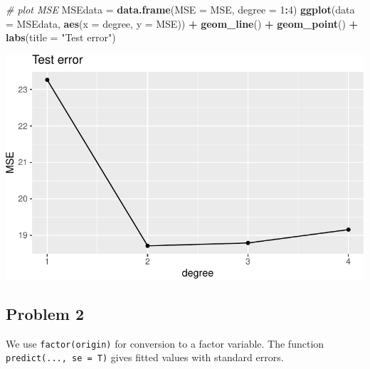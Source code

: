 \documentclass[]{article}
\newenvironment{Shaded}{\begin{snugshade}}{\end{snugshade}}
\newcommand{\CommentTok}[1]{\textcolor[rgb]{0.56,0.35,0.01}{\textit{#1}}}
\newcommand{\DataTypeTok}[1]{\textcolor[rgb]{0.13,0.29,0.53}{#1}}
\newcommand{\DecValTok}[1]{\textcolor[rgb]{0.00,0.00,0.81}{#1}}
\newcommand{\KeywordTok}[1]{\textcolor[rgb]{0.13,0.29,0.53}{\textbf{#1}}}
\newcommand{\NormalTok}[1]{#1}
\newcommand{\OperatorTok}[1]{\textcolor[rgb]{0.81,0.36,0.00}{\textbf{#1}}}
\newcommand{\StringTok}[1]{\textcolor[rgb]{0.31,0.60,0.02}{#1}}
\begin{document}
\begin{Shaded}
\begin{Highlighting}[]
\CommentTok{# plot MSE}
\NormalTok{MSEdata =}\StringTok{ }\KeywordTok{data.frame}\NormalTok{(}\DataTypeTok{MSE =}\NormalTok{ MSE, }\DataTypeTok{degree =} \DecValTok{1}\OperatorTok{:}\DecValTok{4}\NormalTok{)}
\KeywordTok{ggplot}\NormalTok{(}\DataTypeTok{data =}\NormalTok{ MSEdata, }\KeywordTok{aes}\NormalTok{(}\DataTypeTok{x =}\NormalTok{ degree, }\DataTypeTok{y =}\NormalTok{ MSE)) }\OperatorTok{+}\StringTok{ }\KeywordTok{geom_line}\NormalTok{() }\OperatorTok{+}\StringTok{ }\KeywordTok{geom_point}\NormalTok{() }\OperatorTok{+}\StringTok{ }
\StringTok{    }\KeywordTok{labs}\NormalTok{(}\DataTypeTok{title =} \StringTok{"Test error"}\NormalTok{)}
\end{Highlighting}
\end{Shaded}

\includegraphics{RecEx7-sol_files/figure-latex/unnamed-chunk-2-3.pdf}

\hypertarget{problem-2}{%
\subsection{Problem 2}\label{problem-2}}

We use \texttt{factor(origin)} for conversion to a factor variable. The
function \texttt{predict(...,\ se\ =\ T)} gives fitted values with
standard errors.
\end{document}
